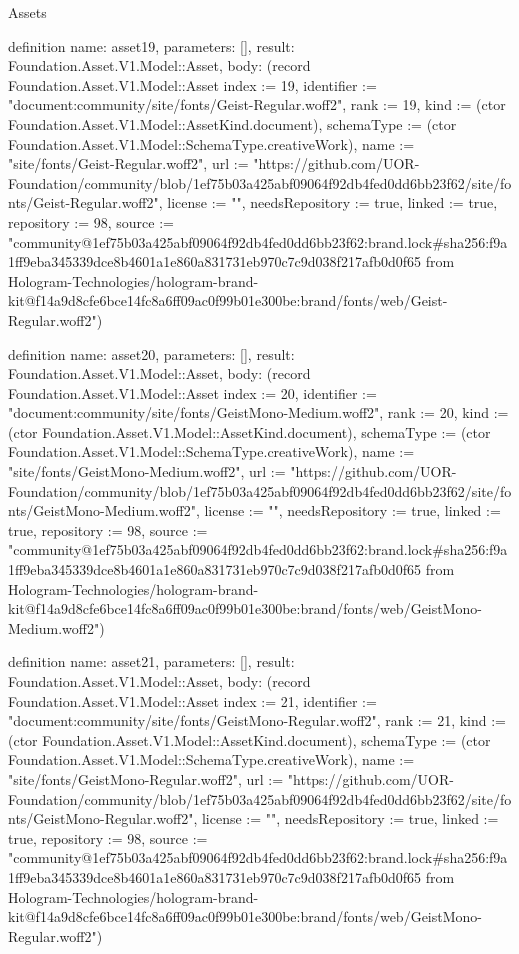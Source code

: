 \begin{lexlean}{Assets}
\begin{semanticmodule}
definition{
  name: asset19,
  parameters: [],
  result: Foundation.Asset.V1.Model::Asset,
  body: (record Foundation.Asset.V1.Model::Asset {index := 19, identifier := "document:community/site/fonts/Geist-Regular.woff2", rank := 19, kind := (ctor Foundation.Asset.V1.Model::AssetKind.document), schemaType := (ctor Foundation.Asset.V1.Model::SchemaType.creativeWork), name := "site/fonts/Geist-Regular.woff2", url := "https://github.com/UOR-Foundation/community/blob/1ef75b03a425abf09064f92db4fed0dd6bb23f62/site/fonts/Geist-Regular.woff2", license := "", needsRepository := true, linked := true, repository := 98, source := "community@1ef75b03a425abf09064f92db4fed0dd6bb23f62:brand.lock#sha256:f9a1ff9eba345339dce8b4601a1e860a831731eb970c7c9d038f217afb0d0f65 from Hologram-Technologies/hologram-brand-kit@f14a9d8cfe6bce14fc8a6ff09ac0f99b01e300be:brand/fonts/web/Geist-Regular.woff2"})
}

definition{
  name: asset20,
  parameters: [],
  result: Foundation.Asset.V1.Model::Asset,
  body: (record Foundation.Asset.V1.Model::Asset {index := 20, identifier := "document:community/site/fonts/GeistMono-Medium.woff2", rank := 20, kind := (ctor Foundation.Asset.V1.Model::AssetKind.document), schemaType := (ctor Foundation.Asset.V1.Model::SchemaType.creativeWork), name := "site/fonts/GeistMono-Medium.woff2", url := "https://github.com/UOR-Foundation/community/blob/1ef75b03a425abf09064f92db4fed0dd6bb23f62/site/fonts/GeistMono-Medium.woff2", license := "", needsRepository := true, linked := true, repository := 98, source := "community@1ef75b03a425abf09064f92db4fed0dd6bb23f62:brand.lock#sha256:f9a1ff9eba345339dce8b4601a1e860a831731eb970c7c9d038f217afb0d0f65 from Hologram-Technologies/hologram-brand-kit@f14a9d8cfe6bce14fc8a6ff09ac0f99b01e300be:brand/fonts/web/GeistMono-Medium.woff2"})
}

definition{
  name: asset21,
  parameters: [],
  result: Foundation.Asset.V1.Model::Asset,
  body: (record Foundation.Asset.V1.Model::Asset {index := 21, identifier := "document:community/site/fonts/GeistMono-Regular.woff2", rank := 21, kind := (ctor Foundation.Asset.V1.Model::AssetKind.document), schemaType := (ctor Foundation.Asset.V1.Model::SchemaType.creativeWork), name := "site/fonts/GeistMono-Regular.woff2", url := "https://github.com/UOR-Foundation/community/blob/1ef75b03a425abf09064f92db4fed0dd6bb23f62/site/fonts/GeistMono-Regular.woff2", license := "", needsRepository := true, linked := true, repository := 98, source := "community@1ef75b03a425abf09064f92db4fed0dd6bb23f62:brand.lock#sha256:f9a1ff9eba345339dce8b4601a1e860a831731eb970c7c9d038f217afb0d0f65 from Hologram-Technologies/hologram-brand-kit@f14a9d8cfe6bce14fc8a6ff09ac0f99b01e300be:brand/fonts/web/GeistMono-Regular.woff2"})
}


\end{semanticmodule}
\end{lexlean}
